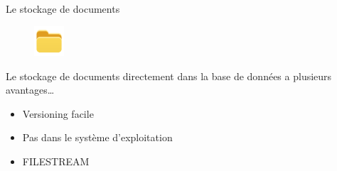 \begin{frame}{Le stockage de documents}
\begin{figure}[h!]
  \includegraphics[width=0.10\textwidth]{images/iconfinder_website_-_folder_3440836}
\end{figure}
  Le stockage de documents directement dans la base de données a plusieurs avantages\dots
  \begin{itemize}
  \item Versioning facile
  \item Pas dans le système d'exploitation
  \item FILESTREAM
  \end{itemize}
\end{frame}